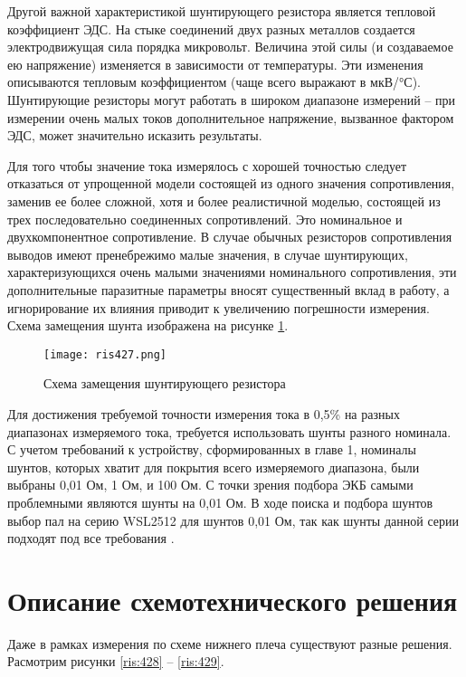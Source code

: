 Другой важной характеристикой шунтирующего резистора является тепловой коэффициент ЭДС. На стыке 
соединений двух разных металлов создается электродвижущая сила порядка микровольт. Величина этой 
силы (и создаваемое ею напряжение) изменяется в зависимости от температуры. Эти изменения описываются 
тепловым коэффициентом (чаще всего выражают в мкВ/°С). Шунтирующие резисторы могут работать в широком 
диапазоне измерений -- при измерении очень малых токов дополнительное напряжение, вызванное фактором 
ЭДС, может значительно исказить результаты.

Для того чтобы значение тока измерялось с хорошей точностью следует отказаться от упрощенной модели 
состоящей из одного значения сопротивления, заменив ее более сложной, хотя и более реалистичной моделью, 
состоящей из трех последовательно соединенных сопротивлений. Это номинальное и двухкомпонентное 
сопротивление. В случае обычных резисторов сопротивления выводов имеют пренебрежимо малые значения, 
в случае шунтирующих, характеризующихся очень малыми значениями номинального сопротивления, 
эти дополнительные паразитные параметры вносят существенный вклад в работу, а игнорирование их 
влияния приводит к увеличению погрешности измерения. Схема замещения шунта изображена на рисунке 
\ref{ris:427}.

\begin{figure}[H]
\centering
\texttt{[image: ris427.png]}
\caption{Схема замещения шунтирующего резистора}
\label{ris:427}
\end{figure}

Для достижения требуемой точности измерения тока в 0,5\% на разных диапазонах измеряемого тока, 
требуется использовать шунты разного номинала. С учетом требований к устройству, сформированных в главе 1,
номиналы шунтов, которых хватит для покрытия всего измеряемого диапазона, были выбраны 
0,01 Ом, 1 Ом, и 100 Ом. С точки зрения подбора ЭКБ самыми проблемными являются шунты на 0,01 Ом. 
В ходе поиска и подбора шунтов выбор пал на серию WSL2512 для шунтов 0,01 Ом, так как шунты данной серии
подходят под все требования \cite{GooglePatent:1}. 

\section{Описание схемотехнического решения}
\hspace{1cm}

Даже в рамках измерения по схеме нижнего плеча существуют разные решения. Расмотрим рисунки \ref{ris:428} --
\ref{ris:429}.


